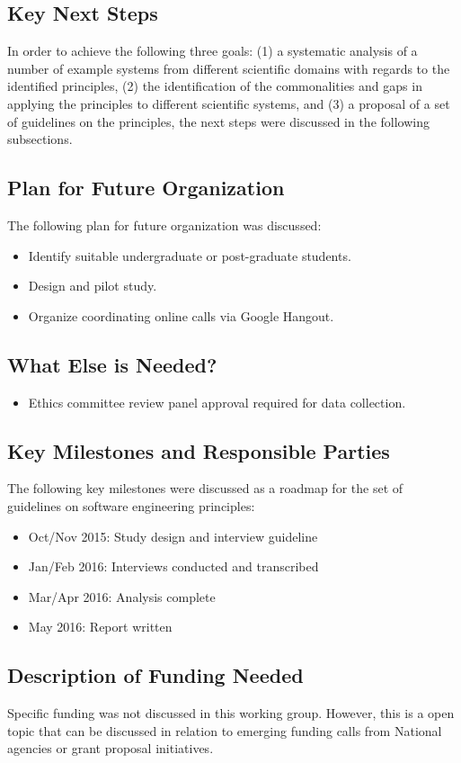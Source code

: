 \subsection{Key Next Steps}

In order to achieve the following three goals: (1) a systematic analysis of a number of example systems from
different scientific domains with regards to the identified principles, (2) the
identification of the commonalities and gaps in applying the principles to different
scientific systems, and (3) a proposal of a set of guidelines on the
principles, the next steps were discussed in the following subsections.

\subsection{Plan for Future Organization}

The following plan for future organization was discussed:
\begin{itemize}
\item Identify suitable undergraduate or post-graduate students.
\item Design and pilot study.
\item Organize coordinating online calls via Google Hangout.
\end{itemize}

\subsection{What Else is Needed?}

\begin{itemize}
\item Ethics committee review panel approval required for data collection.
\end{itemize}

\subsection{Key Milestones and Responsible Parties}

The following key milestones were discussed as a roadmap for the set of
guidelines on software engineering principles:
\begin{itemize}
\item Oct/Nov 2015: Study design and interview guideline
\item Jan/Feb 2016: Interviews conducted and transcribed
\item Mar/Apr 2016: Analysis complete
\item May 2016: Report written
\end{itemize}

\subsection{Description of Funding Needed}

Specific funding was not discussed in this working group. However, this is a
open topic that can be discussed in relation to emerging funding calls from
National agencies or grant proposal initiatives.
